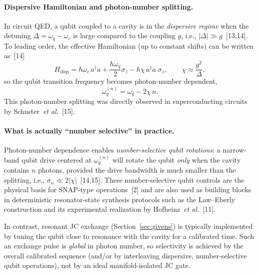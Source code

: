 \documentclass[11pt]{article}
\begin{document}
\paragraph{Dispersive Hamiltonian and photon-number splitting.}
In circuit QED, a qubit coupled to a cavity is in the \emph{dispersive regime} when
the detuning $\Delta=\omega_q-\omega_c$ is large compared to the coupling $g$,
i.e., $|\Delta|\gg g$~[13,14].
To leading order, the effective Hamiltonian (up to constant shifts) can be written as~[14]
\begin{equation}
H_{\mathrm{disp}}
=\hbar\omega_c\,a^\dagger a
+\frac{\hbar\omega_q}{2}\sigma_z
-\hbar\chi\,a^\dagger a\;\sigma_z,
\qquad
\chi \approx \frac{g^2}{\Delta},
\label{eq:dispersive-H}
\end{equation}
so the qubit transition frequency becomes photon-number dependent,
\begin{equation}
\omega_q^{(n)}=\omega_q - 2\chi\,n.
\label{eq:number-dependent-freq}
\end{equation}
This photon-number splitting was directly observed in superconducting circuits by
Schuster~\emph{et al.}~[15].

\paragraph{What is actually ``number selective'' in practice.}
Photon-number dependence enables \emph{number-selective qubit rotations}:
a narrow-band qubit drive centered at $\omega_q^{(n)}$ will rotate the qubit
\emph{only} when the cavity contains $n$ photons, provided the drive bandwidth is
much smaller than the splitting, i.e., $\sigma_\omega\ll 2|\chi|$~[14,15].
These number-selective qubit controls are the physical basis for SNAP-type operations~[2]
and are also used as building blocks in deterministic resonator-state synthesis
protocols such as the Law--Eberly construction and its experimental realization by
Hofheinz~\emph{et al.}~[11].

In contrast, resonant JC exchange (Section~\ref{sec:givens}) is typically implemented by tuning the qubit close
to resonance with the cavity for a calibrated time.  Such an exchange pulse is \emph{global} in photon number,
so selectivity is achieved by the overall calibrated sequence (and/or by interleaving dispersive, number-selective
qubit operations), not by an ideal manifold-isolated JC gate.
\end{document}
